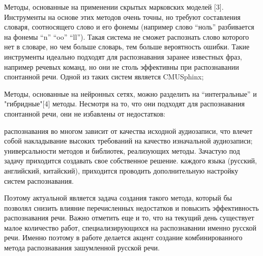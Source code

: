 \documentclass[conference]{IEEEtran}
\begin{document}
    Методы, основанные на применении скрытых марковских моделей [3].
    Инструменты на основе этих методов очень точны, но требуют составления словаря, соотносящего слово и его фонемы (например слово “ноль” разбивается на фонемы “n” “oo” “ll”).
    Такая система не сможет распознать слово которого нет в словаре, но чем больше словарь, тем больше вероятность ошибки.
    Такие инструменты идеально подходят для распознавания заранее известных фраз, например речевых команд, но они не столь эффективны при распознавании спонтанной речи.
    Одной из таких систем является CMUSphinx;

    Методы, основанные на нейронных сетях, можно разделить на “интегральные” и "гибридные"[4] методы.
    Несмотря на то, что они подходят для распознавания спонтанной речи, они не избавлены от недостатков:

    \begin{itemize}
         распознавания во многом зависит от качества исходной аудиозаписи, что влечет собой накладывание высоких требований на качество изначальной аудиозаписи;
         универсальности методов и библиотек, реализующих методы.
        Зачастую под задачу приходится создавать свое собственное решение.
         каждого языка (русский, английский, китайский), приходится проводить дополнительную настройку систем распознавания.
    \end{itemize}
    Поэтому актуальной является задача создания такого метода, который бы позволял снизить влияние перечисленных недостатков и повысить эффективность распознавания речи.
    Важно отметить еще и то, что на текущий день существует малое количество работ, специализирующихся на распознавании именно русской речи.
    Именно поэтому в работе делается акцент создание комбинированного метода распознавания зашумленной русской речи.
\end{document}
